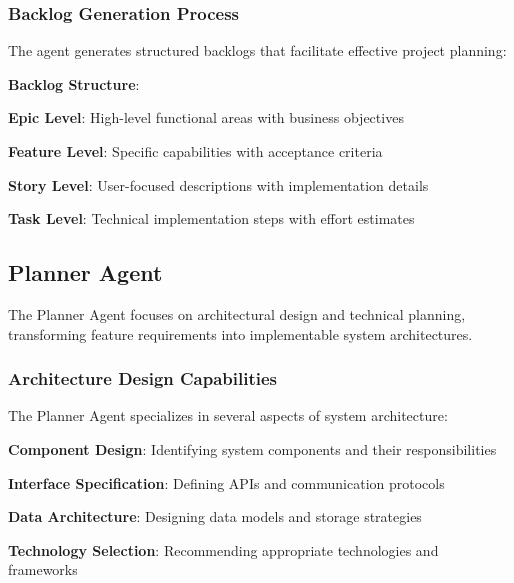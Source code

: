 \subsubsection*{Backlog Generation Process}

The agent generates structured backlogs that facilitate effective project planning:

\begin{alertbox}
\textbf{Backlog Structure}:
\begin{compactlist}
    \item \textbf{Epic Level}: High-level functional areas with business objectives
    \item \textbf{Feature Level}: Specific capabilities with acceptance criteria
    \item \textbf{Story Level}: User-focused descriptions with implementation details
    \item \textbf{Task Level}: Technical implementation steps with effort estimates
\end{compactlist}
\end{alertbox}

\subsection*{Planner Agent}

The Planner Agent focuses on architectural design and technical planning, transforming feature requirements into implementable system architectures.

\subsubsection*{Architecture Design Capabilities}

The Planner Agent specializes in several aspects of system architecture:

\begin{compactlist}
    \item \textbf{Component Design}: Identifying system components and their responsibilities
    \item \textbf{Interface Specification}: Defining APIs and communication protocols
    \item \textbf{Data Architecture}: Designing data models and storage strategies
    \item \textbf{Technology Selection}: Recommending appropriate technologies and frameworks
\end{compactlist}

